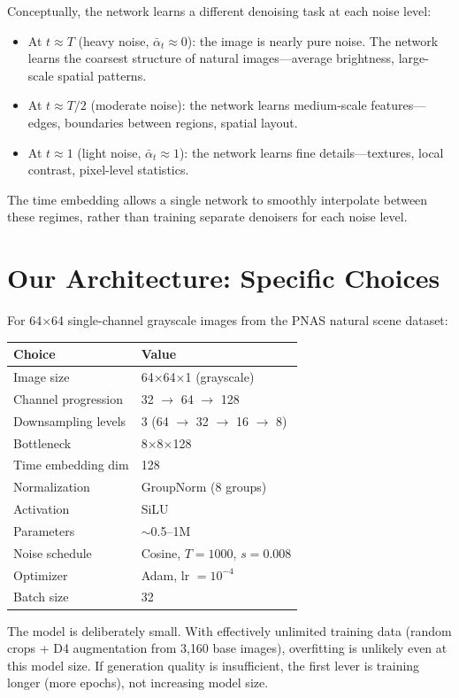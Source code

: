 \documentclass[11pt]{article}
\newcommand{\alphabar}{\bar{\alpha}}
\begin{document}
Conceptually, the network learns a different denoising task at each noise level:

\begin{itemize}[nosep]
    \item At $t \approx T$ (heavy noise, $\alphabar_t \approx 0$): the image is
          nearly pure noise. The network learns the coarsest structure of natural
          images---average brightness, large-scale spatial patterns.
    \item At $t \approx T/2$ (moderate noise): the network learns medium-scale
          features---edges, boundaries between regions, spatial layout.
    \item At $t \approx 1$ (light noise, $\alphabar_t \approx 1$): the network
          learns fine details---textures, local contrast, pixel-level statistics.
\end{itemize}

The time embedding allows a single network to smoothly interpolate between these
regimes, rather than training separate denoisers for each noise level.

\section{Our Architecture: Specific Choices}

For 64$\times$64 single-channel grayscale images from the PNAS natural scene
dataset:

\begin{center}
\begin{tabular}{ll}
\toprule
Choice & Value \\
\midrule
Image size & 64$\times$64$\times$1 (grayscale) \\
Channel progression & 32 $\to$ 64 $\to$ 128 \\
Downsampling levels & 3 (64 $\to$ 32 $\to$ 16 $\to$ 8) \\
Bottleneck & 8$\times$8$\times$128 \\
Time embedding dim & 128 \\
Normalization & GroupNorm (8 groups) \\
Activation & SiLU \\
Parameters & $\sim$0.5--1M \\
Noise schedule & Cosine, $T = 1000$, $s = 0.008$ \\
Optimizer & Adam, lr $= 10^{-4}$ \\
Batch size & 32 \\
\bottomrule
\end{tabular}
\end{center}

The model is deliberately small. With effectively unlimited training data
(random crops + D4 augmentation from 3{,}160 base images), overfitting is
unlikely even at this model size. If generation quality is insufficient, the
first lever is training longer (more epochs), not increasing model size.
\end{document}
